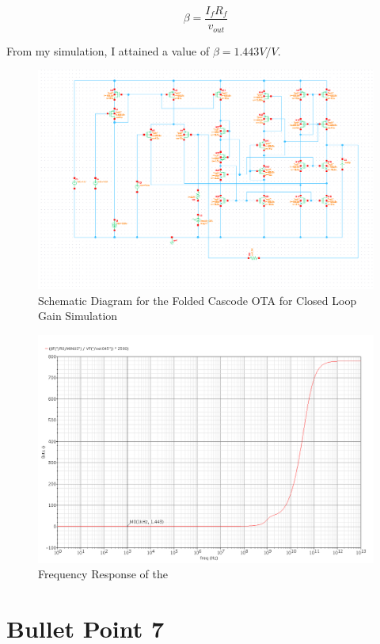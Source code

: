 \documentclass{article}
\begin{document}
\begin{equation}
\beta = \frac{I_f R_f}{v_{out}}
\end{equation}

From my simulation, I attained a value of $\beta = 1.443V/V$.

\begin{figure}[H]
\centering
\includegraphics[width=7in]{bullet6_schem.png}
\caption{Schematic Diagram for the Folded Cascode OTA for Closed Loop Gain Simulation}
\label{b6_schem}
\end{figure}

\begin{figure}[H]
\centering
\includegraphics[width=7in]{bullet6_beta.png}
\caption{Frequency Response of the }
\label{b6_beta}
\end{figure}

\section{Bullet Point 7}
\end{document}
